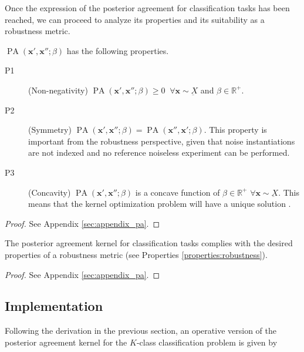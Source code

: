 Once the expression of the posterior agreement for classification tasks has been reached,
we can proceed to analyze its properties and its suitability as a robustness metric. 


\begin{theorem}\label{theorem:pa_properties}
    $\operatorname{PA}\left(\bm{x}', \bm{x}'' ; \beta\right)$ has the following properties.

    \begin{description}
        \item[P1](Non-negativity) $\operatorname{PA}\left(\bm{x}', \bm{x}'' ; \beta\right) \geq 0 \;\; \forall \bm{x} \sim \underbar{X}$ and $\beta \in \mathbb{R}^+$.
        \item[P2](Symmetry)  $\operatorname{PA}\left(\bm{x}', \bm{x}'' ; \beta\right) = \operatorname{PA}\left(\bm{x}'', \bm{x}'; \beta\right)$. This property is 
        important from the robustness perspective, given that noise
        instantiations are not indexed and no reference noiseless experiment can be performed.
        \item[P3](Concavity) $\operatorname{PA}\left(\bm{x}', \bm{x}'' ; \beta\right)$ is a concave function of $\beta \in \mathbb{R}^+$ $\forall \bm{x} \sim \underbar{X}$. This means that 
        the kernel optimization problem will have a unique solution
        \cite{boydConvexOptimization2004}.
    \end{description}
\end{theorem}

\begin{proof}
    See Appendix \ref{sec:appendix_pa}.
\end{proof}

\begin{theorem}
    The posterior agreement kernel for classification tasks complies with the desired properties of a robustness metric (see Properties \ref{properties:robustness}).
\end{theorem}
\begin{proof}
    See Appendix \ref{sec:appendix_pa}.
\end{proof}

\subsection{Implementation}

Following the derivation in the previous section, an operative version of the 
posterior agreement kernel for the $K$-class classification problem is given by

